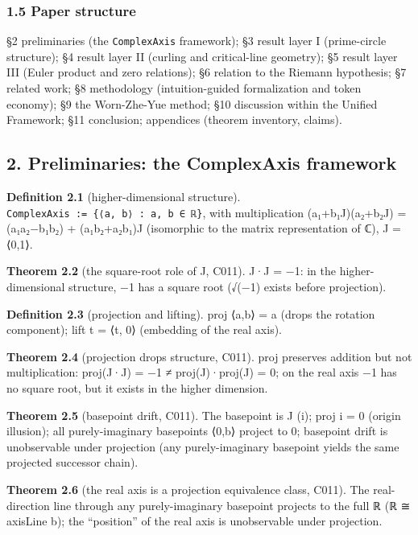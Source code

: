 \documentclass[
]{article}
\begin{document}
\subsubsection{1.5 Paper structure}\label{paper-structure}

§2 preliminaries (the \texttt{ComplexAxis} framework); §3 result layer I
(prime-circle structure); §4 result layer II (curling and critical-line
geometry); §5 result layer III (Euler product and zero relations); §6
relation to the Riemann hypothesis; §7 related work; §8 methodology
(intuition-guided formalization and token economy); §9 the Worn-Zhe-Yue
method; §10 discussion within the Unified Framework; §11 conclusion;
appendices (theorem inventory, claims).

\subsection{2. Preliminaries: the ComplexAxis
framework}\label{preliminaries-the-complexaxis-framework}

\textbf{Definition 2.1} (higher-dimensional structure).
\texttt{ComplexAxis\ :=\ \{⟨a,\ b⟩\ :\ a,\ b\ ∈\ ℝ\}}, with
multiplication (a₁+b₁J)(a₂+b₂J) = (a₁a₂−b₁b₂) + (a₁b₂+a₂b₁)J (isomorphic
to the matrix representation of ℂ), J = ⟨0,1⟩.

\textbf{Theorem 2.2} (the square-root role of J, C011). J·J = −1: in the
higher-dimensional structure, −1 has a square root (√(−1) exists before
projection).

\textbf{Definition 2.3} (projection and lifting). proj ⟨a,b⟩ = a (drops
the rotation component); lift t = ⟨t, 0⟩ (embedding of the real axis).

\textbf{Theorem 2.4} (projection drops structure, C011). proj preserves
addition but not multiplication: proj(J·J) = −1 ≠ proj(J)·proj(J) = 0;
on the real axis −1 has no square root, but it exists in the higher
dimension.

\textbf{Theorem 2.5} (basepoint drift, C011). The basepoint is J (i);
proj i = 0 (origin illusion); all purely-imaginary basepoints ⟨0,b⟩
project to 0; basepoint drift is unobservable under projection (any
purely-imaginary basepoint yields the same projected successor chain).

\textbf{Theorem 2.6} (the real axis is a projection equivalence class,
C011). The real-direction line through any purely-imaginary basepoint
projects to the full ℝ (ℝ ≅ axisLine b); the ``position'' of the real
axis is unobservable under projection.
\end{document}
